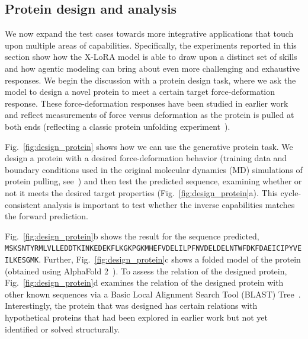 \subsection{Protein design and analysis}

We now expand the test cases towards more integrative applications that touch upon multiple areas of capabilities. Specifically, the experiments reported in this section show how the X-LoRA model is able to draw upon a distinct set of skills and how agentic modeling can bring about even more challenging and exhaustive responses. We begin the discussion with a protein design task, where we ask the model to design a  novel protein to meet a certain target force-deformation response. These force-deformation responses have been studied in earlier work~\cite{Ni2023ForceGen:Model} and reflect measurements of force versus deformation as the protein is pulled at both ends (reflecting a classic protein unfolding experiment~\cite{Lu1998UnfoldingSimulation.}). 

Fig.~\ref{fig:design_protein} shows how we can use the generative protein task. We design a protein with a desired force-deformation behavior (training data and boundary conditions used in the original molecular dynamics (MD) simulations of protein pulling, see~\cite{Ni2023ForceGen:Model}) and then test the predicted sequence, examining whether or not it meets the desired target properties (Fig.~\ref{fig:design_protein}a). This cycle-consistent analysis is important to test whether the inverse capabilities matches the forward prediction. 

Fig.~\ref{fig:design_protein}b shows the result for the sequence predicted, \texttt{MSKSNTYRMLVLLEDDTKINKEDEKFLKGKPGKMHEFVDELILPFNVDELDELNTWFDKFDAEICIPYVEILKESGMK}. Further, Fig.~\ref{fig:design_protein}c shows a folded model of the protein (obtained using AlphaFold 2~\cite{Jumper2021HighlyAlphaFoldb}). To assess the relation of the designed protein, Fig.~\ref{fig:design_protein}d examines the relation of the designed protein with other known sequences via a Basic Local Alignment Search Tool (BLAST) Tree~\cite{Altschul1990BasicTool}. Interestingly, the protein that was designed has certain relations with hypothetical proteins that had been explored in earlier work but not yet identified or solved structurally. 

